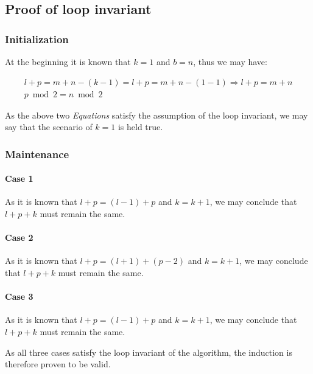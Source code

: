 \documentclass[12pt]{article}
\begin{document}
\subsection{Proof of loop invariant}
\subsubsection{Initialization}
At the beginning it is known that $k = 1$ and $b = n$, thus we may have:

\begin{gather}
    l + p = m + n - (k - 1) = l + p = m + n - (1 - 1) \Rightarrow l + p = m + n \\
    p\bmod 2 = n \bmod 2
\end{gather}

As the above two \textit{Equations} satisfy the assumption of the loop invariant, we may say that the scenario of $k = 1$ is held true.

\subsubsection{Maintenance}

\paragraph{Case 1} As it is known that $l + p = (l - 1) + p$ and $k = k + 1$, we may conclude that $l + p + k$ must remain the same.

\paragraph{Case 2} As it is known that $l + p = (l + 1) + (p - 2)$ and $k = k + 1$, we may conclude that $l + p + k$ must remain the same.

\paragraph{Case 3} As it is known that $l + p = (l - 1) + p$ and $k = k + 1$, we may conclude that $l + p + k$ must remain the same.

As all three cases satisfy the loop invariant of the algorithm, the induction is therefore proven to be valid.





%
% 
% 
\end{document}

